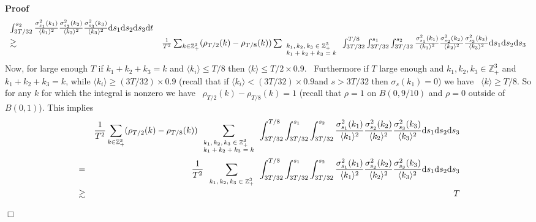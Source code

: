 \documentclass[11pt]{article}
\newcommand{\mathd}{\mathrm{d}}
\newcommand{\tmscript}[1]{\text{\scriptsize{$#1$}}}
\newenvironment{proof}{\noindent\textbf{Proof\ }}{\hspace*{\fill}$\Box$\medskip}
\begin{document}
\begin{proof}
{\[\begin{array}{ll}
       \int^{s_2}_{3 T / 32} \frac{\sigma^2_{s_1} (k_1)}{\langle k_1
       \rangle^2} \frac{\sigma^2_{s_2} (k_2)}{\langle k_2 \rangle^2}
       \frac{\sigma^2_{s_3} (k_3)}{\langle k_3 \rangle^2} \mathd s_1 \mathd
       s_2 \mathd s_3 \mathd t\\
       \gtrsim & \frac{1}{T^2} \sum_{k \in \mathbb{Z}_+^3} (\rho_{T / 2} (k) -
       \rho_{T / 8} (k)) \sum_{\tmscript{\begin{array}{l}
         k_1, k_2, k_3 \in \mathbb{Z}_+^3\\
         k_1 + k_2 + k_3 = k
       \end{array}}} \int^{T / 8}_{3 T / 32} \int^{s_1}_{3 T / 32}
       \int^{s_2}_{3 T / 32} \frac{\sigma^2_{s_1} (k_1)}{\langle k_1
       \rangle^2} \frac{\sigma^2_{s_2} (k_2)}{\langle k_2 \rangle^2}
       \frac{\sigma^2_{s_3} (k_3)}{\langle k_3 \rangle^2} \mathd s_1 \mathd
       s_2 \mathd s_3
     \end{array} \]}
  Now, for large enough $T$ if $k_1 + k_2 + k_3 = k$ and $\langle k_i \rangle
  \leqslant T / 8$ then $\langle k \rangle \leqslant T / 2 \times 0.9$. \
  Furthermore if $T$ large enough and $k_1, k_2, k_3 \in \mathbb{Z}_+^3$ and
  $k_1 + k_2 + k_3 = k$, while $\langle k_i \rangle \geqslant (3 T / 32)
  \times 0.9$ (recall that if $\langle k_i \rangle < (3 T / 32) \times
  0.9$\quad and $s > 3 T / 32$ then $\sigma_s (k_1) = 0$) we have \ $\langle k
  \rangle \geqslant T / 8$. So for any $k$ for which the integral is nonzero
  we have \ $\rho_{T / 2} (k) - \rho_{T / 8} (k) = 1$ (recall that $\rho = 1$
  on $B (0, 9 / 10)$ and $\rho = 0$ outside of $B (0, 1)$). This implies
    {\footnotesize
  \begin{eqnarray*}
    &  & \frac{1}{T^2} \sum_{k \in \mathbb{Z}_+^3} (\rho_{T / 2} (k) -
    \rho_{T / 8} (k)) \sum_{\tmscript{\begin{array}{l}
      k_1, k_2, k_3 \in \mathbb{Z}_+^3\\
      k_1 + k_2 + k_3 = k
    \end{array}}} \int^{T / 8}_{3 T / 32} \int^{s_1}_{3 T / 32} \int^{s_2}_{3
    T / 32} \frac{\sigma^2_{s_1} (k_1)}{\langle k_1 \rangle^2}
    \frac{\sigma^2_{s_2} (k_2)}{\langle k_2 \rangle^2} \frac{\sigma^2_{s_3}
    (k_3)}{\langle k_3 \rangle^2} \mathd s_1 \mathd s_2 \mathd s_3\\
    & = & \frac{1}{T^2} \sum_{\tmscript{\begin{array}{l}
      k_1, k_2, k_3 \in \mathbb{Z}_+^3
    \end{array}}} \int^{T / 8}_{3 T / 32} \int^{s_1}_{3 T / 32} \int^{s_2}_{3
    T / 32} \frac{\sigma^2_{s_1} (k_1)}{\langle k_1 \rangle^2}
    \frac{\sigma^2_{s_2} (k_2)}{\langle k_2 \rangle^2} \frac{\sigma^2_{s_3}
    (k_3)}{\langle k_3 \rangle^2} \mathd s_1 \mathd s_2 \mathd s_3\\
    & \gtrsim & T
  \end{eqnarray*}}
  
\end{proof}
\end{document}
